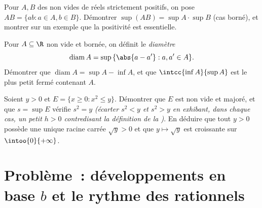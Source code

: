 \begin{exercise}[$\star\star\star$]\label{exo:b1:reals:10}
Pour $A, B$ des  non vides de réels strictement positifs, on
pose $AB = \{ab : a \in A, b \in B\}$. Démontrer $\sup(AB) = \sup A
\cdot \sup B$ (cas borné), et montrer sur un exemple que la
positivité est essentielle.
\end{exercise}

\begin{exercise}[$\star\star$]\label{exo:b1:reals:11}
Pour $A \subseteq \R$ non vide et bornée, on définit le
\emph{diamètre}
\[
\operatorname{diam} A = \sup\,\{\abs{a - a'} : a, a' \in A\} .
\]
Démontrer que $\operatorname{diam} A = \sup A - \inf A$, et que
$\intcc{\inf A}{\sup A}$ est le plus petit  fermé
contenant $A$.
\end{exercise}

\begin{exercise}[$\star\star\star$]\label{exo:b1:reals:12}
Soient $y > 0$ et $E = \{x \geq 0 : x^2 \leq y\}$. Démontrer que $E$
est non vide et majoré, et que $s = \sup E$ vérifie $s^2 = y$
\emph{(écarter $s^2 < y$ et $s^2 > y$ en exhibant, dans chaque cas,
un petit $h > 0$ contredisant la définition de la )}. En déduire que tout $y > 0$ possède une unique racine
carrée $\sqrt y > 0$ et que $y \mapsto \sqrt y$ est croissante sur
$\intoo{0}{+\infty}$.
\end{exercise}

\section{Problème~: développements en base $b$ et le rythme des rationnels}

